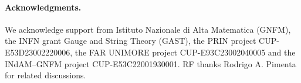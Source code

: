 \documentclass[10pt]{article}
\numberwithin{equation}{section}
\numberwithin{equation}{subsection}
\begin{document}
\bigskip











\paragraph{Acknowledgments.} We acknowledge support from Istituto Nazionale di Alta Matematica (GNFM),  the INFN grant Gauge and String Theory (GAST),  the PRIN project CUP-E53D23002220006,  the FAR UNIMORE project CUP-E93C23002040005 and  the INdAM–GNFM project CUP-E53C22001930001. RF thanks  Rodrigo A. Pimenta for related discussions. 




% 
\end{document}
